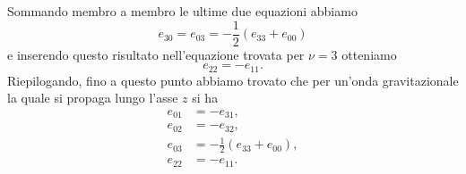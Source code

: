 Sommando membro a membro le ultime due equazioni abbiamo
\begin{equation}
  e_{30}= e_{03} = -\frac{1}{2}(e_{33} + e_{00})
\end{equation}
e inserendo questo risultato nell'equazione trovata per $\nu = 3$ otteniamo
\begin{equation}
  e_{22} = -e_{11}.
\end{equation}
Riepilogando, fino a questo punto abbiamo trovato che per un'onda gravitazionale
la quale si propaga lungo l'asse $z$ si ha
\begin{subequations}
  \begin{align}
    e_{01} &= -e_{31}, \\
    e_{02} &= -e_{32}, \\
    e_{03} &= -\frac{1}{2}(e_{33} + e_{00}), \\
    \label{8.31}
    e_{22} &= -e_{11}.
  \end{align}
\end{subequations}


